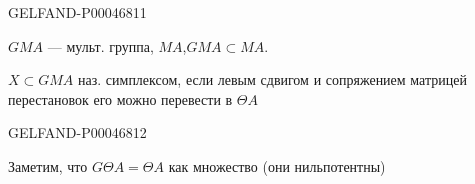 \begin{GelfandAdjacentEvidence}{GELFAND-P000468}{11}


$GMA$ — мульт. группа, $MA$,\quad $GMA\subset MA$.


$X\subset GMA$ наз. симплексом, если левым сдвигом и сопряжением матрицей перестановок его можно перевести в $\Theta A$
\end{GelfandAdjacentEvidence}
\begin{GelfandAdjacentEvidence}{GELFAND-P000468}{12}


Заметим, что $G\Theta A=\Theta A$ как множество (они нильпотентны)
\end{GelfandAdjacentEvidence}



